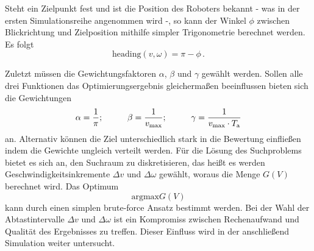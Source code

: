 Steht ein Zielpunkt fest und ist die Position des Roboters bekannt - was in der ersten Simulationsreihe angenommen wird -, so kann der Winkel $\phi$ zwischen Blickrichtung und Zielposition mithilfe simpler Trigonometrie berechnet werden. Es folgt
\begin{equation}
\text{heading}(v,\omega) = \pi - \phi\,.
\end{equation}

Zuletzt müssen die Gewichtungsfaktoren $\alpha$, $\beta$ und $\gamma$ gewählt werden. Sollen alle drei Funktionen das Optimierungsergebnis gleichermaßen beeinflussen bieten sich die Gewichtungen
\begin{equation}
\alpha = \frac{1}{\pi};\hspace{1cm} \beta = \frac{1}{v_{\text{max}}}; \hspace{1cm} \gamma = \frac{1}{v_{\text{max}}\cdot T_{\text{a}}}
\end{equation} 
an. Alternativ können die Ziel unterschiedlich stark in die Bewertung einfließen indem die Gewichte ungleich verteilt werden. Für die Lösung des Suchproblems bietet es sich an, den Suchraum zu diskretisieren, das heißt es werden Geschwindigkeitsinkremente $\Delta v$ und $\Delta \omega$ gewählt, woraus die Menge $G(V)$ berechnet wird. Das Optimum 
\begin{equation}
\text{arg}\text{max} G(V)
\end{equation}
kann durch einen simplen brute-force Ansatz bestimmt werden. Bei der Wahl der Abtastintervalle $\Delta v$ und $\Delta \omega$ ist ein Kompromiss zwischen Rechenaufwand und Qualität des Ergebnisses zu treffen. Dieser Einfluss wird in der anschließend Simulation weiter untersucht.